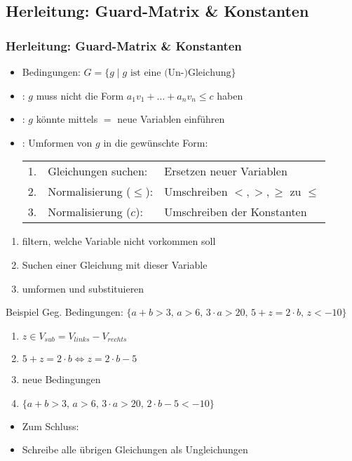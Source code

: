 \subsection{Herleitung: Guard-Matrix \& Konstanten}
\begin{frame}
	\frametitle{Herleitung: Guard-Matrix \& Konstanten}
	\begin{itemize}
		\item Bedingungen: $G=\{g \mid g \text{ ist eine (Un-)Gleichung}\}$
		\item<2-> : $g$ muss nicht die Form $a_1 v_1+\dots +a_n v_n \le c$ haben
		\item<3-> : $g$ k\"onnte mittels \glqq$=$\grqq\xspace neue Variablen einf\"uhren
		\item<4-> : Umformen von $g$ in die gew\"unschte Form: 
			\begin{tabular}{cll}
				1. & Gleichungen suchen:   & Ersetzen \glqq neuer\grqq\xspace Variablen \\
				2. & Normalisierung ($\le$): & Umschreiben $<,>,\ge$ zu $\le$ \\
				3. & Normalisierung ($c$):   & Umschreiben der Konstanten\\
			\end{tabular}
	\end{itemize}	
\end{frame}

\begin{frame}[fragile]
	\begin{enumerate}
		\item filtern, welche Variable nicht vorkommen soll
		\item Suchen einer Gleichung mit dieser Variable
		\item umformen und substituieren
	\end{enumerate}
	\begin{exampleblock}{Beispiel}
		Geg. Bedingungen:
		$\{a + b > 3\text{, } a > 6 \text{, } 3 \cdot  a > 20 \text{, } 5 + z = 2 \cdot  b \text{, } z < -10\}$
		\begin{enumerate}
			\item $z \in V_{sub}=V_{links}-V_{rechts}$
			\item $5+z=2\cdot b \Leftrightarrow z=2\cdot b - 5$
			\item neue Bedingungen
			\item[] $\{a + b > 3\text{, } a > 6 \text{, } 3 \cdot  a > 20 \text{, } 2\cdot b-5 < -10\}$
		\end{enumerate}
	\end{exampleblock}
	\begin{itemize}
		\item[] Zum Schluss: 
		\item[] Schreibe alle \"ubrigen Gleichungen als Ungleichungen
	\end{itemize}
\end{frame}

